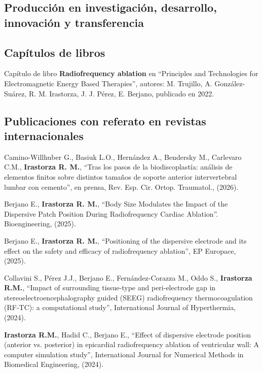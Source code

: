\documentclass[margin,line]{res}
\begin{document}
\begin{resume}
\bigskip

\section{ Producción en investigación, desarrollo, innovación y transferencia}
\vspace*{-.2in}

\subsection{ Capítulos de libros} 

Capítulo de libro \textbf{Radiofrequency ablation} en ``Principles and Technologies for Electromagnetic Energy Based Therapies'', autores: M. Trujillo, A. González-Suárez, R. M. Irastorza, J. J. Pérez, E. Berjano, publicado en 2022.


\subsection{ Publicaciones con referato en revistas internacionales}

 Camino-Willhuber G., Basiuk L.O., Hernández A., Bendersky M., Carlevaro C.M., {\bf Irastorza R. M.}, ``Tras los pasos de la biodiscoplastía: análisis de elementos finitos sobre distintos tamaños de soporte anterior intervertebral lumbar con cemento'', en prensa, Rev. Esp. Cir. Ortop. Traumatol., (2026).

Berjano E., {\bf Irastorza R. M.}, ``Body Size Modulates the Impact of the Dispersive Patch Position During Radiofrequency Cardiac Ablation''. Bioengineering, (2025).

Berjano E., {\bf Irastorza R. M.}, ``Positioning of the dispersive electrode and its effect on the safety and efficacy of radiofrequency ablation'', EP Europace, (2025).

Collavini S., Pérez J.J., Berjano E., Fernández-Corazza M., Oddo S., {\bf Irastorza R.M.},
``Impact of surrounding tissue-type and peri-electrode gap in stereoelectroencephalography guided (SEEG) radiofrequency thermocoagulation (RF-TC): a computational study'', International Journal of Hyperthermia, (2024).

{\bf Irastorza R.M.}, Hadid C., Berjano E., ``Effect of dispersive electrode position (anterior vs. posterior) in epicardial radiofrequency ablation of ventricular wall: A computer simulation study'', International Journal for Numerical Methods in Biomedical Engineering, (2024).


\end{resume}
\end{document}
